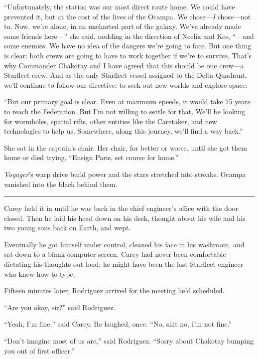 \documentclass[twoside,letterpaper,12pt]{memoir}
\begin{document}
``Unfortunately, the station was our most direct route home. We could have prevented it, but at the cost of the lives of the Ocampa. We chose---\textit{I }chose---not to. Now, we’re alone, in an uncharted part of the galaxy. We’ve already made some friends here---” she said, nodding in the direction of Neelix and Kes, ``---and some enemies. We have no idea of the dangers we're going to face. But one thing is clear: both crews are going to have to work together if we're to survive. That's why Commander Chakotay and I have agreed that this should be one crew---a Starfleet crew. And as the only Starfleet vessel assigned to the Delta Quadrant, we'll continue to follow our directive: to seek out new worlds and explore space. 

``But our primary goal is clear. Even at maximum speeds, it would take 75 years to reach the Federation. But I'm not willing to settle for that. We'll be looking for wormholes, spatial rifts, other entities like the Caretaker, and new technologies to help us. Somewhere, along this journey, we'll find a way back.” 

She sat in the captain’s chair. Her chair, for better or worse, until she got them home or died trying. ``Ensign Paris, set course for home.” 

\textit{Voyager}’s warp drive build power and the stars stretched into streaks. Ocampa vanished into the black behind them. 

\begin{center}\rule{3cm}{0.4 pt}\end{center} 

Carey held it in until he was back in the chief engineer’s office with the door closed. Then he laid his head down on his desk, thought about his wife and his two young sons back on Earth, and wept. 

Eventually he got himself under control, cleaned his face in his washroom, and sat down to a blank computer screen. Carey had never been comfortable dictating his thoughts out loud; he might have been the last Starfleet engineer who knew how to type. 

Fifteen minutes later, Rodriguez arrived for the meeting he’d scheduled. 

``Are you okay, sir?” said Rodriguez. 

``Yeah, I’m fine,” said Carey. He laughed, once. ``No, shit no, I’m not fine.” 

``Don’t imagine most of us are,” said Rodriguez. ``Sorry about Chakotay bumping you out of first officer.” 
\end{document}
